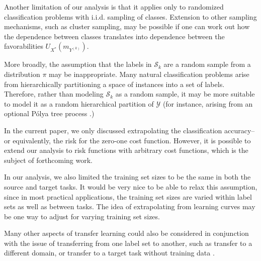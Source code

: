 \documentclass[twoside,11pt]{article}
\begin{document}
Another limitation of our analysis is that it applies only to randomized classification problems with i.i.d. sampling of classes.  Extension to other sampling mechanisms, such as cluster sampling, may be possible if one can work out how the dependence between classes translates into dependence between the favorabilities $U_{X^*}(m_{Y^{(k)}})$.

More broadly, the assumption that the labels in $\mathcal{S}_k$ are a random sample from a distribution $\pi$ may be inappropriate.  Many natural classification problems arise from hierarchically partitioning a space of instances into a set of labels.  Therefore, rather than modeling $\mathcal{S}_k$ as a random sample, it may be more suitable to model it as a random hierarchical partition of $\mathcal{Y}$ (for instance, arising from an optional P{\'o}lya tree process \citep{wong2010optional}.)

In the current paper, we only discussed extrapolating the classification accuracy--or equivalently, the risk for the zero-one cost function.  However, it is possible to extend our analysis to risk functions with arbitrary cost functions, which is the subject of forthcoming work.

In our analysis, we also limited the training set sizes to be the same in both the source and target tasks.  It would be very nice to be able to relax this assumption, since in most practical applications, the training set sizes are varied within label sets as well as between tasks.  The idea of extrapolating from learning curves \citep{cortes1994learning} may be one way to adjust for varying training set sizes.

Many other aspects of transfer learning could also be considered in conjunction with the issue of transferring from one label set to another, such as transfer to a different domain, or transfer to a target task without training data \citep{pan2010survey}.

 



\end{document}
